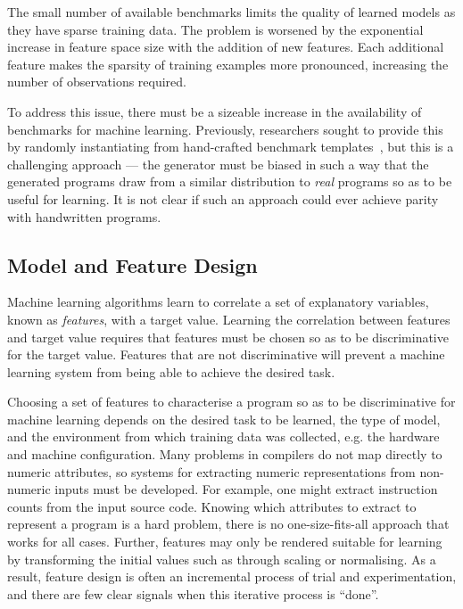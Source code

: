 The small number of available benchmarks limits the quality of learned models as they have sparse training data. The problem is worsened by the exponential increase in feature space size with the addition of new features. Each additional feature makes the sparsity of training examples more pronounced, increasing the number of observations required.

To address this issue, there must be a sizeable increase in the availability of benchmarks for machine learning. Previously, researchers sought to provide this by randomly instantiating from hand-crafted benchmark templates~\cite{Chiu2015}, but this is a challenging approach --- the generator must be biased in such a way that the generated programs draw from a similar distribution to \emph{real} programs so as to be useful for learning. It is not clear if such an approach could ever achieve parity with handwritten programs.

\subsection{Model and Feature Design}
\label{subsec:challenge-features}

Machine learning algorithms learn to correlate a set of explanatory variables, known as \emph{features}, with a target value. Learning the correlation between features and target value requires that features must be chosen so as to be discriminative for the target value. Features that are not discriminative will prevent a machine learning system from being able to achieve the desired task.

Choosing a set of features to characterise a program so as to be discriminative for machine learning  depends on the desired task to be learned, the type of model, and the environment from which training data was collected, e.g. the hardware and machine configuration. Many problems in compilers do not map directly to numeric attributes, so systems for extracting numeric representations from non-numeric inputs must be developed. For example, one might extract instruction counts from the input source code. Knowing which attributes to extract to represent a program is a hard problem, there is no one-size-fits-all approach that works for all cases. Further, features may only be rendered suitable for learning by transforming the initial values such as through scaling or normalising. As a result, feature design is often an incremental process of trial and experimentation, and there are few clear signals when this iterative process is ``done''.

